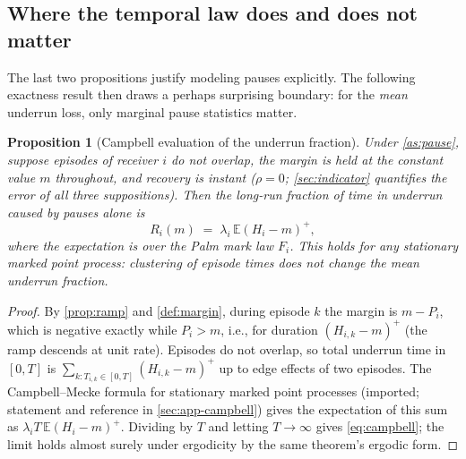 \documentclass[11pt, a4paper]{article}
\theoremstyle{definition}
\theoremstyle{plain}
\newtheorem{proposition}[theorem]{Proposition}
\theoremstyle{remark}
\newcommand{\E}{\mathbb{E}}
\newcommand{\pos}[1]{\left(#1\right)^{\!+}}
\begin{document}
\subsection{Where the temporal law does and does not matter}
\label{sec:where-temporal}

The last two propositions justify modeling pauses explicitly.  The
following exactness result then draws a perhaps surprising boundary: for
the \emph{mean} underrun loss, only marginal pause statistics matter.

\begin{proposition}[Campbell evaluation of the underrun fraction]
\label{prop:campbell}
Under \cref{as:pause}, suppose episodes of receiver $i$ do not overlap,
the margin is held at the constant value $m$ throughout, and recovery is
instant ($\rho = 0$; \cref{sec:indicator} quantifies the error of all
three suppositions).  Then the long-run fraction of time in underrun
caused by pauses alone is
\begin{equation}\label{eq:campbell}
  R_i(m)
  \;=\;
  \lambda_i \,\E\pos{H_i - m},
\end{equation}
where the expectation is over the Palm mark law $F_i$.  This holds for
\emph{any} stationary marked point process: clustering of episode times
does not change the mean underrun fraction.
\end{proposition}

\begin{proof}
By \cref{prop:ramp} and \cref{def:margin}, during episode $k$ the margin
is $m - P_i$, which is negative exactly while $P_i > m$, i.e., for
duration $\pos{H_{i,k}-m}$ (the ramp descends at unit rate).  Episodes do
not overlap, so total underrun time in $[0,T]$ is
$\sum_{k: T_{i,k}\in[0,T]} \pos{H_{i,k}-m}$ up to edge effects of two
episodes.  The Campbell--Mecke formula for stationary marked point
processes (imported; statement and reference in \cref{sec:app-campbell})
gives the expectation of this sum as
$\lambda_i T\,\E\pos{H_i - m}$.  Dividing by $T$ and letting
$T \to \infty$ gives \cref{eq:campbell}; the limit holds almost surely
under ergodicity by the same theorem's ergodic form.
\end{proof}
\end{document}
